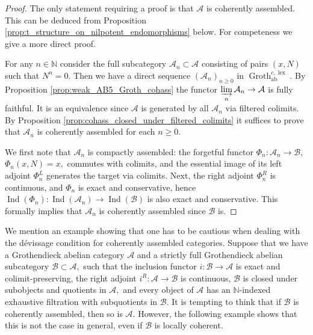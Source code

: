 \documentclass[11pt,leqno]{amsart}
\numberwithin{equation}{section}
\def\N{\mathbb{N}}
\newcommand{\indlim}[1][]{\mathop{\varinjlim}\limits_{#1}}
\newcommand{\lex}{\operatorname{lex}}
\newcommand{\Groth}{\operatorname{Groth}}
\newcommand{\cA}{{\mathcal A}}
\newcommand{\cB}{{\mathcal B}}
\newcommand{\ab}{\operatorname{ab}}
\newcommand{\Ind}{\operatorname{Ind}}
\begin{document}
\begin{proof}
The only statement requiring a proof is that $\cA$ is coherently assembled. This can be deduced from Proposition \ref{prop:t_structure_on_nilpotent_endomorphisms} below. For competeness we give a more direct proof.

For any $n\in\N$ consider the full subcategory $\cA_n\subset\cA$ consisting of pairs $(x,N)$ such that $N^n=0.$ Then we have a direct sequence $(\cA_n)_{n\geq 0}$ in $\Groth^{c,\lex}_{\ab}.$ By Proposition \ref{prop:weak_AB5_Groth_cohass} the functor $\indlim[n]\cA_n\to\cA$ is fully faithful. It is an equivalence since $\cA$ is generated by all $\cA_n$ via filtered colimits. By Proposition \ref{prop:cohass_closed_under_filtered_colimits} it suffices to prove that $\cA_n$ is coherently assembled for each $n\geq 0.$

We first note that $\cA_n$ is compactly assembled: the forgetful functor $\Phi_n:\cA_n\to\cB,$ $\Phi_n(x,N)=x,$ commutes with colimits, and the essential image of its left adjoint $\Phi_n^L$ generates the target via colimits. Next, the right adjoint $\Phi_n^R$ is continuous, and $\Phi_n$ is exact and conservative, hence  $\Ind(\Phi_n):\Ind(\cA_n)\to\Ind(\cB)$ is also exact and conservative. This formally implies that $\cA_n$ is coherently assembled since $\cB$ is.  
\end{proof}

We mention an example showing that one has to be cautious when dealing with the d\'evissage condition for coherently assembled categories. Suppose that we have a Grothendieck abelian category $\cA$ and a strictly full Grothendieck abelian subcategory $\cB\subset\cA,$ such that the inclusion functor $i:\cB\to\cA$ is exact and colimit-preserving, the right adjoint $i^R:\cA\to\cB$ is continuous, $\cB$ is closed under subobjects and quotients in $\cA,$ and every object of $\cA$ has an $\N$-indexed exhaustive filtration with subquotients in $\cB.$ It is tempting to think that if $\cB$ is coherently assembled, then so is $\cA.$ However, the following example shows that this is not the case in general, even if $\cB$ is locally coherent.
\end{document}
